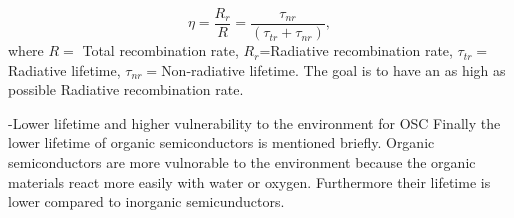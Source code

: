 \[
 \eta = \frac{R_{r}}{R} = \frac{\tau_{nr}}{(\tau_{tr}+\tau_{nr})},
\]
where $R=$ Total recombination rate, $R_{r}$=Radiative recombination rate, $\tau_{tr}=$Radiative lifetime, $\tau_{nr}=$Non-radiative lifetime. The goal is to have an as high as possible Radiative recombination rate. 

-Lower lifetime and higher vulnerability to the environment for OSC
Finally the lower lifetime of organic semiconductors is mentioned briefly. Organic semiconductors are more vulnorable to the environment because the organic materials react more easily with water or oxygen. Furthermore their lifetime is lower compared to inorganic semicunductors. 
